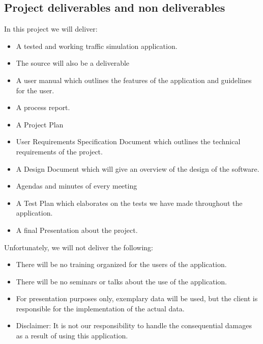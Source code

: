 \documentclass[a4paper,11pt]{article}
\begin{document}
    \subsection{Project deliverables and non deliverables  }
    In this project we will deliver: 
    \begin{itemize}
    \item A tested and working traffic simulation application.
    \item The source will also be a deliverable
    \item A user manual which outlines the features of the application and guidelines for the user.
    \item A process report.
    \item A Project Plan
    \item User Requirements Specification Document which outlines the technical requirements of the project.
    \item A Design Document which will give an overview of the design of the software.  
    \item Agendas and minutes of every meeting
    \item A Test Plan which elaborates on the tests we have made throughout the application.
    \item A final Presentation about the project.
    \end{itemize}
   
    
    Unfortunately, we will not deliver the following:
    \begin{itemize}
    \item There will be no training organized for the users of the application.
    \item There will be no seminars or talks about the use of the application.
    \item For presentation purposes only, exemplary data will be used, but the client is responsible for the implementation of the actual data. 
    \item Disclaimer: It is not our responsibility to handle the consequential damages as a result of using this application.
    
    \end{itemize}
    
         
       
\end{document}
